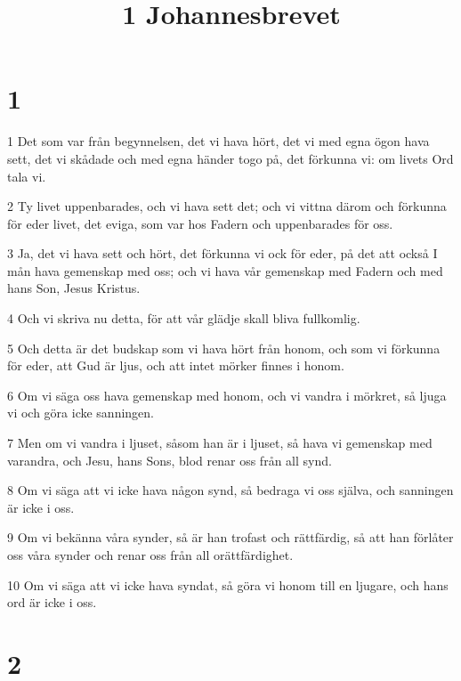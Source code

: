 

\title{1 Johannesbrevet}


\chapter{1}

\par 1 Det som var från begynnelsen, det vi hava hört, det vi med egna ögon hava sett, det vi skådade och med egna händer togo på, det förkunna vi: om livets Ord tala vi.
\par 2 Ty livet uppenbarades, och vi hava sett det; och vi vittna därom och förkunna för eder livet, det eviga, som var hos Fadern och uppenbarades för oss.
\par 3 Ja, det vi hava sett och hört, det förkunna vi ock för eder, på det att också I mån hava gemenskap med oss; och vi hava vår gemenskap med Fadern och med hans Son, Jesus Kristus.
\par 4 Och vi skriva nu detta, för att vår glädje skall bliva fullkomlig.
\par 5 Och detta är det budskap som vi hava hört från honom, och som vi förkunna för eder, att Gud är ljus, och att intet mörker finnes i honom.
\par 6 Om vi säga oss hava gemenskap med honom, och vi vandra i mörkret, så ljuga vi och göra icke sanningen.
\par 7 Men om vi vandra i ljuset, såsom han är i ljuset, så hava vi gemenskap med varandra, och Jesu, hans Sons, blod renar oss från all synd.
\par 8 Om vi säga att vi icke hava någon synd, så bedraga vi oss själva, och sanningen är icke i oss.
\par 9 Om vi bekänna våra synder, så är han trofast och rättfärdig, så att han förlåter oss våra synder och renar oss från all orättfärdighet.
\par 10 Om vi säga att vi icke hava syndat, så göra vi honom till en ljugare, och hans ord är icke i oss.

\chapter{2}


